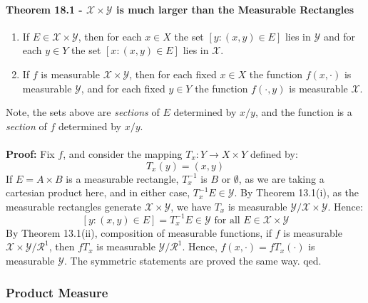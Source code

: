 \documentclass[12pt,a4paper]{article}
\newcommand{\1}[1]{\mathbbm{1}\left\{ #1 \right\}}
\newcommand{\rcal}{\mathcal{R}}
\newcommand{\xcal}{\mathcal{X}}
\newcommand{\ycal}{\mathcal{Y}}
\begin{document}
\paragraph{Theorem 18.1 - $\xcal \times \ycal$ is much larger than the Measurable Rectangles} 
\begin{enumerate}
	\item If $E \in \xcal \times \ycal$, then for each $x \in X$ the set $[y : (x,y) \in E]$ lies in $\ycal$ and for each $y \in Y$ the set $[x : (x,y) \in E]$ lies in $\xcal$.
	
	\item If $f$ is measurable $\xcal \times \ycal$, then for each fixed $x \in X$ the function $f(x, \cdot)$ is measurable $\ycal$, and for each fixed $y \in Y$ the function $f(\cdot, y)$ is measurable $\xcal$.
\end{enumerate}
Note, the sets above are \textit{sections} of $E$ determined by $x/y$, and the function is a \textit{section} of $f$ determined by $x/y$.
\\\\
\textbf{Proof:} Fix $f$, and consider the mapping $T_x: Y \to X \times Y$ defined by:
$$
	T_x(y) = (x,y)
$$
If $E = A \times B$ is a measurable rectangle, $T_x^{-1}$ is $B$ or $\emptyset$, as we are taking a cartesian product here, and in either case, $T_x^{-1}E \in \ycal$. By Theorem 13.1(i), as the measurable rectangles generate $\xcal \times \ycal$, we have $T_x$ is measurable $\ycal/\xcal \times \ycal$. Hence:
$$
	[y : (x,y) \in E] = T_x^{-1}E \in \ycal \text{ for all $E \in \xcal \times \ycal$}
$$
By Theorem 13.1(ii), composition of measurable functions, if $f$ is measurable $\xcal \times \ycal/\rcal^1$, then $fT_x$ is measurable $\ycal/\rcal^1$. Hence, $f(x, \cdot) = fT_x(\cdot)$ is measurable $\ycal$. The symmetric statements are proved the same way. qed.

\subsubsection{Product Measure}
\end{document}
